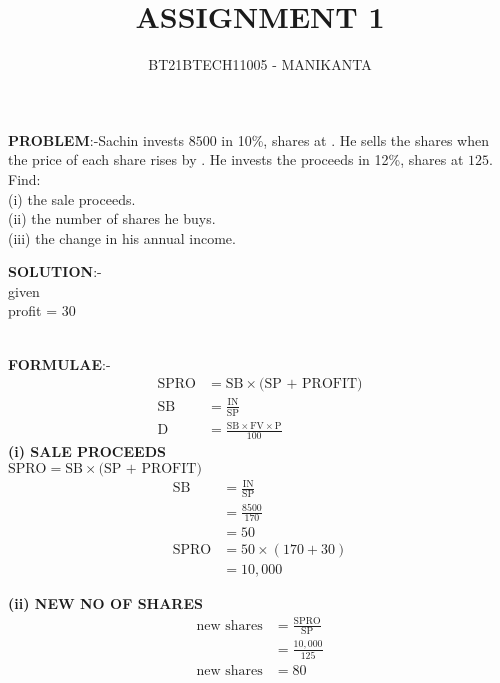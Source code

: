 \documentclass[journal,12pt,twocolumn]{IEEEtran}
\begin{document}
\vspace{3cm}
\title{ASSIGNMENT 1}
\author{BT21BTECH11005 - MANIKANTA}

\maketitle
\textbf{PROBLEM}:-Sachin invests \rupee$8500$ in 10\%,  shares at . He sells the shares when the price of each share rises by . He invests the proceeds in 12\%,  shares at \rupee$125$.\\
Find:\\
(i) the sale proceeds.\\
(ii) the number of  shares he buys.\\
(iii) the change in his annual income.\\

\medskip

\textbf{SOLUTION}:-\\
given\\
\hspace*{1cm} profit = \rupee$30$\\
\begin{table}[ht!]
    
\end{table}\\
\textbf{FORMULAE}:-\\

\begin{align}
\text{SPRO} &= \text{SB} \times \text{(SP + PROFIT)}\\
\text{SB}& = \frac{\text{IN}}{\text{SP}}\\
\text{D}&=\frac{\text{SB} \times \text{FV} \times \text{P}}{100}
\end{align}
\textbf{(i) SALE PROCEEDS}\\
\hspace*{1cm}$\text{SPRO} = \text{SB} \times \text{(SP + PROFIT)}$\\
\begin{align}
\text{SB}& = \frac{\text{IN}}{\text{SP}}\\
     &= \frac{8500}{170}\\
     &=50\\
     \text{SPRO}&= 50 \times(170+30)\\
     &=10,000
\end{align}

\medskip

\textbf{(ii) NEW NO OF SHARES}\\
\begin{align}
\text{new shares}&=\frac{\text{SPRO}}{\text{SP}}\\
&=\frac{10,000}{125}\\
\text{new shares}&=80
\end{align}
\end{document}
